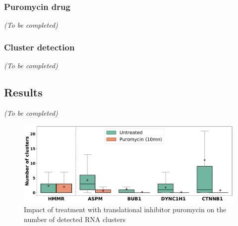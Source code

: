 \subsubsection{Puromycin drug}

\begin{center}
	\textit{(To be completed)}
\end{center}

\subsubsection{Cluster detection}

\begin{center}
	\textit{(To be completed)}
\end{center}


\subsection{Results}
\label{subsec:results_translation_factories}

\begin{center}
	\textit{(To be completed)}
\end{center}

\begin{figure}[h]
    \centering
    \includegraphics[width=\textwidth]{figures/chapter5/plot_puromycin}
    \caption{Impact of treatment with translational inhibitor puromycin on the number of detected RNA clusters}
    \label{fig:plot_puromycin}
\end{figure}



